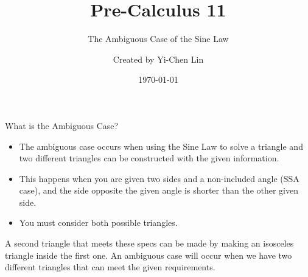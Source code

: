 \documentclass[aspectratio=169]{beamer}
\title{Pre-Calculus 11}
\subtitle{The Ambiguous Case of the Sine Law}
\author{Created by Yi-Chen Lin}
\date{\today}
\begin{document}
\begin{frame}
    \titlepage
\end{frame}

\begin{frame}{What is the Ambiguous Case?}
    \begin{tcolorbox}[colback=lightgray,colframe=primary,title=What is the Ambiguous Case?]
        \footnotesize
        \begin{itemize}
            \item The ambiguous case occurs when using the Sine Law to solve a triangle and two different triangles can be constructed with the given information.
            \item This happens when you are given two sides and a non-included angle (SSA case), and the side opposite the given angle is shorter than the other given side.
            \item You must consider both possible triangles.
        \end{itemize}
    \end{tcolorbox}
    
    \vspace{0.5em}
    \begin{center}
    \end{center}
    \vspace{0.5em}
    \footnotesize
    A second triangle that meets these specs can be made by making an isosceles triangle inside the first one. An ambiguous case will occur when we have two different triangles that can meet the given requirements.
\end{frame}
\end{document}
